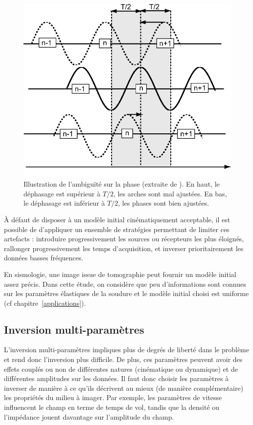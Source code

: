 \begin{figure}[!h]
	\centering
	\includegraphics[scale=0.8]{img/ambig_phase.png}
	\caption{Illustration de l'ambiguïté sur la phase (extraite de \cite{brossier_these}). En haut, le déphasage est supérieur à $T/2$, les arches sont mal ajustées. En bas, le déphasage est inférieur à $T/2$, les phases sont bien ajustées. \label{ambig_phase}}
\end{figure}

À défaut de disposer à un modèle initial cinématiquement acceptable, il est possible de d'appliquer un ensemble de stratégies permettant de limiter ces artefacts : introduire progressivement les sources ou récepteurs les plus éloignés, rallonger progressivement les temps d'acquisition, et inverser prioritairement les données basses fréquences.


En sismologie, une image issue de tomographie peut fournir un modèle initial assez précis. Dans cette étude, on considère que peu d'informations sont connues sur les paramètres élastiques de la soudure et le modèle initial choisi est uniforme (cf chapitre~\ref{applications}).


\subsection{Inversion multi-paramètres}
 
L'inversion multi-paramètres impliques plus de degrés de liberté dans le problème et rend donc l'inversion plus difficile. De plus, ces paramètres peuvent avoir des effets couplés ou non de différentes natures (cinématique ou dynamique) et de différentes amplitudes sur les données. Il faut donc choisir les paramètres à inverser de manière à ce qu'ils décrivent au mieux (de manière complémentaire) les propriétés du milieu à imager. Par exemple, les paramètres de vitesse influencent le champ en terme de temps de vol, tandis que la densité ou l'impédance jouent davantage sur l'amplitude du champ.\\

